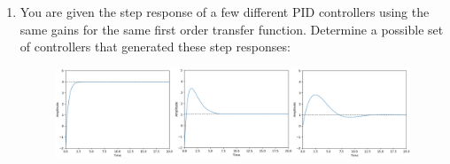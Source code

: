 \begin{enumerate}
\item You are given the step response of a few different PID controllers using the same gains for the same first order transfer function. 
Determine a possible set of controllers that generated these step responses:

\begin{figure}[!htb]
\begin{center}
\includegraphics[scale=0.280]{img/longitudinal_control/Full-Size-Image.png}
\end{center}
\label{Full-Size-Image}
\end{figure}


\end{enumerate}
